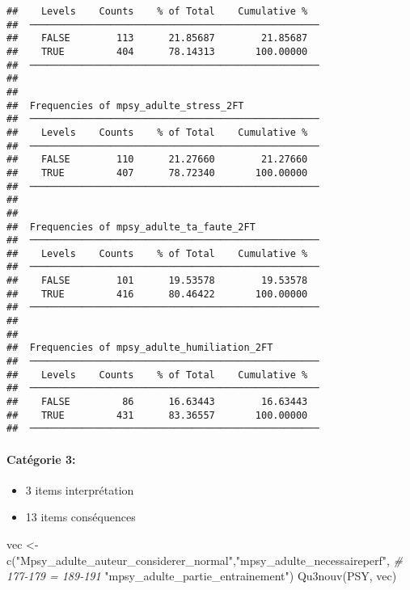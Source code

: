\documentclass[
]{article}
\newenvironment{Shaded}{\begin{snugshade}}{\end{snugshade}}
\newcommand{\CommentTok}[1]{\textcolor[rgb]{0.56,0.35,0.01}{\textit{#1}}}
\newcommand{\FunctionTok}[1]{\textcolor[rgb]{0.00,0.00,0.00}{#1}}
\newcommand{\NormalTok}[1]{#1}
\newcommand{\OtherTok}[1]{\textcolor[rgb]{0.56,0.35,0.01}{#1}}
\newcommand{\StringTok}[1]{\textcolor[rgb]{0.31,0.60,0.02}{#1}}
\providecommand{\tightlist}{%
  \setlength{\itemsep}{0pt}\setlength{\parskip}{0pt}}
\begin{document}
\begin{verbatim}
##    Levels    Counts    % of Total    Cumulative %   
##  ────────────────────────────────────────────────── 
##    FALSE        113      21.85687        21.85687   
##    TRUE         404      78.14313       100.00000   
##  ────────────────────────────────────────────────── 
## 
## 
##  Frequencies of mpsy_adulte_stress_2FT              
##  ────────────────────────────────────────────────── 
##    Levels    Counts    % of Total    Cumulative %   
##  ────────────────────────────────────────────────── 
##    FALSE        110      21.27660        21.27660   
##    TRUE         407      78.72340       100.00000   
##  ────────────────────────────────────────────────── 
## 
## 
##  Frequencies of mpsy_adulte_ta_faute_2FT            
##  ────────────────────────────────────────────────── 
##    Levels    Counts    % of Total    Cumulative %   
##  ────────────────────────────────────────────────── 
##    FALSE        101      19.53578        19.53578   
##    TRUE         416      80.46422       100.00000   
##  ────────────────────────────────────────────────── 
## 
## 
##  Frequencies of mpsy_adulte_humiliation_2FT         
##  ────────────────────────────────────────────────── 
##    Levels    Counts    % of Total    Cumulative %   
##  ────────────────────────────────────────────────── 
##    FALSE         86      16.63443        16.63443   
##    TRUE         431      83.36557       100.00000   
##  ──────────────────────────────────────────────────
\end{verbatim}

\hypertarget{catuxe9gorie-3-1}{%
\paragraph{Catégorie 3:}\label{catuxe9gorie-3-1}}

\begin{itemize}
\tightlist
\item
  3 items interprétation
\item
  13 items conséquences
\end{itemize}

\begin{Shaded}
\begin{Highlighting}[]
\NormalTok{vec }\OtherTok{\textless{}{-}} \FunctionTok{c}\NormalTok{(}\StringTok{"Mpsy\_adulte\_auteur\_considerer\_normal"}\NormalTok{,}\StringTok{"mpsy\_adulte\_necessaireperf"}\NormalTok{,  }\CommentTok{\# 177{-}179 = 189{-}191}
        \StringTok{"mpsy\_adulte\_partie\_entrainement"}\NormalTok{) }
\FunctionTok{Qu3nouv}\NormalTok{(PSY, vec)}
\end{Highlighting}
\end{Shaded}
\end{document}

